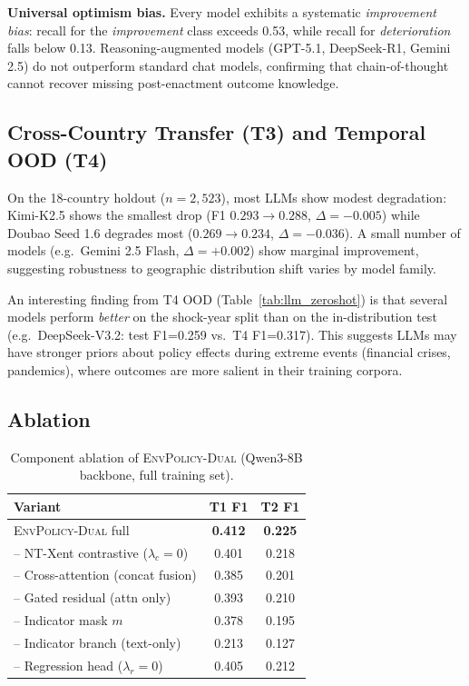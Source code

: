 \documentclass[11pt]{article}
\newcommand{\ours}{\textsc{EnvPolicy-Dual}}
\begin{document}
\textbf{Universal optimism bias.}
Every model exhibits a systematic \emph{improvement bias}: recall for the
\textit{improvement} class exceeds 0.53, while recall for \textit{deterioration}
falls below 0.13. Reasoning-augmented models (GPT-5.1, DeepSeek-R1, Gemini 2.5)
do not outperform standard chat models, confirming that chain-of-thought cannot
recover missing post-enactment outcome knowledge.

\subsection{Cross-Country Transfer (T3) and Temporal OOD (T4)}

On the 18-country holdout ($n{=}2{,}523$), most LLMs show modest degradation: Kimi-K2.5 shows the smallest drop (F1 $0.293\!\to\!0.288$, $\Delta{=}{-}0.005$) while Doubao Seed 1.6 degrades most ($0.269\!\to\!0.234$, $\Delta{=}{-}0.036$). A small number of models (e.g.\ Gemini 2.5 Flash, $\Delta{=}{+}0.002$) show marginal improvement, suggesting robustness to geographic distribution shift varies by model family.

An interesting finding from T4 OOD (Table~\ref{tab:llm_zeroshot}) is that several models perform \emph{better} on the shock-year split than on the in-distribution test (e.g.\ DeepSeek-V3.2: test F1=0.259 vs.\ T4 F1=0.317). This suggests LLMs may have stronger priors about policy effects during extreme events (financial crises, pandemics),  where outcomes are more salient in their training corpora.

\subsection{Ablation}

\begin{table}[t]
\centering\small
\begin{tabular}{@{}lcc@{}}
\toprule
\textbf{Variant} & \textbf{T1 F1} & \textbf{T2 F1} \\
\midrule
\ours{} full                           & \textbf{0.412} & \textbf{0.225} \\
\;-- NT-Xent contrastive ($\lambda_c=0$) & 0.401 & 0.218 \\
\;-- Cross-attention (concat fusion)   & 0.385 & 0.201 \\
\;-- Gated residual (attn only)        & 0.393 & 0.210 \\
\;-- Indicator mask $m$                & 0.378 & 0.195 \\
\;-- Indicator branch (text-only)      & 0.213 & 0.127 \\
\;-- Regression head ($\lambda_r=0$)   & 0.405 & 0.212 \\
\bottomrule
\end{tabular}
\caption{Component ablation of \ours{} (Qwen3-8B backbone, full training set).}
\label{tab:abl}
\end{table}
\end{document}
